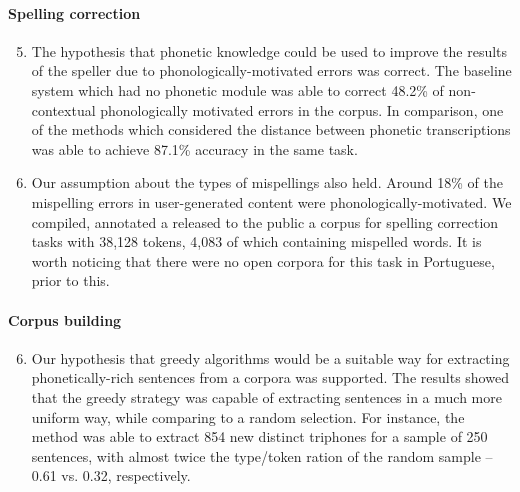 \paragraph*{Spelling correction}
  \begin{enumerate}
    \setcounter{enumi}{4}
    \item The hypothesis that phonetic knowledge could be used to improve the results of the speller due to phonologically-motivated errors was correct. The baseline system which had no phonetic module was able to correct 48.2\% of non-contextual phonologically motivated errors in the corpus. In comparison, one of the methods which considered the distance between phonetic transcriptions was  able to achieve 87.1\% accuracy in the same task.
    \item Our assumption about the types of mispellings also held. Around 18\% of the mispelling errors in user-generated content were phonologically-motivated. We compiled, annotated a released to the public a corpus for spelling correction tasks with 38,128 tokens, 4,083 of which containing mispelled words. It is worth noticing that there were no open corpora for this task in Portuguese, prior to this.
  \end{enumerate}

\paragraph*{Corpus building}
  \begin{enumerate}
    \setcounter{enumi}{5}
    \item Our hypothesis that greedy algorithms would be a suitable way for extracting phonetically-rich sentences from a corpora was supported. The results showed that the greedy strategy was capable of extracting sentences in a much more uniform way, while comparing to a random selection. For instance, the method was able to extract 854 new distinct triphones for a sample of 250 sentences, with almost twice the type/token ration of the random sample -- 0.61 vs. 0.32, respectively.
  \end{enumerate}

